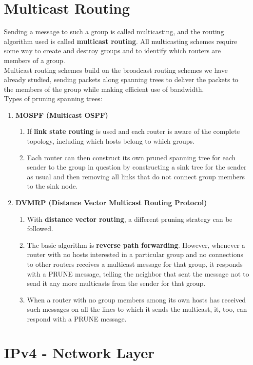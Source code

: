 \documentclass[a4paper,oneside]{book}
\begin{document}
\section{Multicast Routing}
Sending a message to such a group is called multicasting, and the routing algorithm used is called \textbf{multicast routing}. All multicasting schemes require some way to create and destroy groups and to identify which routers are members of a group.\\
Multicast routing schemes build on the broadcast routing schemes we have already studied, sending packets along spanning trees to deliver the packets to the members of the group while making efficient use of bandwidth. \\
Types of pruning spanning trees:
\begin{enumerate}
\item  \textbf{MOSPF (Multicast OSPF)}
\begin{enumerate}
\item If \textbf{link state routing} is used and each router is aware of the complete topology, including which hosts belong to which groups.
\item Each router can then construct its own pruned spanning tree for each sender to the group in question by constructing a sink tree for the sender as usual and then removing all links that do not connect group members to the sink node. 
\end{enumerate}
\item  \textbf{DVMRP (Distance Vector Multicast Routing Protocol) }
\begin{enumerate}
\item With \textbf{distance vector routing}, a different pruning strategy can be followed.
\item The basic algorithm is \textbf{reverse path forwarding}. However, whenever a router with no hosts interested in a particular group and no connections to other routers receives a multicast message for that group, it responds with a PRUNE message, telling the neighbor that sent the message not to send it any more multicasts from the sender for that group.
\item When a router with no group members among its own hosts has received such messages on all the lines to which it sends the multicast, it, too, can respond with a PRUNE message.
\end{enumerate}
\end{enumerate}
\section{IPv4 - Network Layer}
\end{document}
